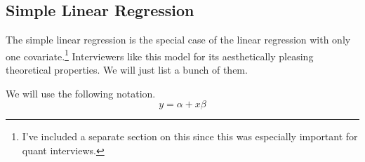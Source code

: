 \subsection{Simple Linear Regression}

  The simple linear regression is the special case of the linear regression with only one covariate.\footnote{I've included a separate section on this since this was especially important for quant interviews.} Interviewers like this model for its aesthetically pleasing theoretical properties. We will just list a bunch of them. 


  \begin{definition}
    \label{def:simple-linear-regression}
    We will use the following notation. 
    \begin{equation}
      y = \alpha + x \beta
    \end{equation}
  \end{definition}

